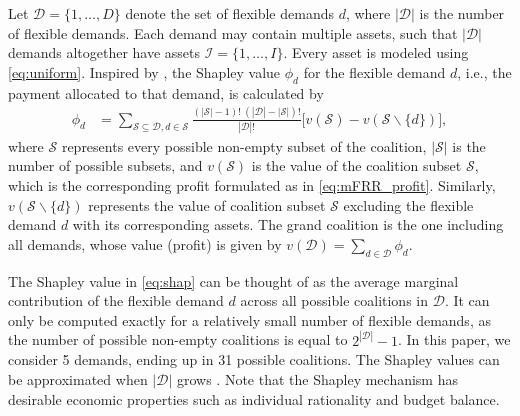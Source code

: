 \documentclass[conference]{IEEEtran}
\begin{document}
Let $\mathcal{D}=\{1, \hdots, D \}$ denote the set of flexible demands $d$, where $|\mathcal{D}|$ is the number of flexible demands. Each demand may contain multiple assets, such that $|\mathcal{D}|$ demands altogether have assets $\mathcal{I}=\{1, \hdots, I \}$. Every asset is modeled using \eqref{eq:uniform}.
%
Inspired by \cite{shapley1997value}, the Shapley value $\phi_d$  for the flexible demand $d$, i.e., the payment allocated to that demand, is calculated by
%
\begin{align}\label{eq:shap}
    \phi_d & = \sum_{\mathcal{S} \subseteq \mathcal{D}, d \in \mathcal{S}} \frac{(|\mathcal{S}|-1)! \ (|\mathcal{D}|-|\mathcal{S}|)!}{|\mathcal{D}|!}\Big[v(\mathcal{S})-v(\mathcal{S} \backslash\{d\})\Big],
\end{align}
%
where $\mathcal{S}$ represents every possible non-empty subset of the coalition, $|\mathcal{S}|$ is the number of possible subsets,  and $v(\mathcal{S})$ is the value of the coalition subset $\mathcal{S}$, which is the corresponding profit formulated as in \eqref{eq:mFRR_profit}. Similarly, $v(\mathcal{S} \backslash\{d\})$ represents the value of coalition subset $\mathcal{S}$ excluding the flexible demand $d$ with its corresponding assets. The grand coalition is the one including all demands, whose value (profit) is given by $v(\mathcal{D}) = \sum_{d \in \mathcal{D}} \phi_{d}$.


The Shapley value in \eqref{eq:shap} can be thought of as the average marginal contribution of the flexible demand $d$ across all possible coalitions in $\mathcal{D}$. It can only be computed exactly for a relatively small number of flexible demands, as the number of possible non-empty coalitions is equal to $2^{|\mathcal{D}|} - 1$. In this paper, we consider 5 demands, ending up in 31 possible coalitions. The Shapley values can be approximated when $|\mathcal{D}|$ grows \cite{castro2009polynomial}.
Note that the Shapley mechanism has desirable economic properties such as individual rationality and budget balance.

\end{document}
